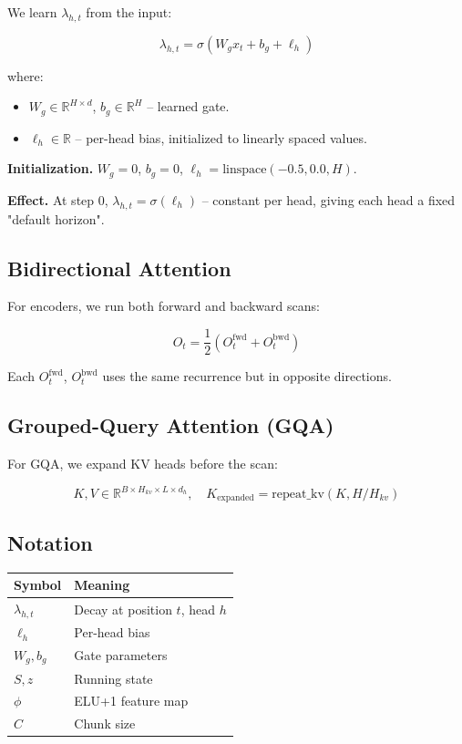 We learn $\lambda_{h,t}$ from the input:

\begin{equation}
\lambda_{h,t} = \sigma(W_g x_t + b_g + \ell_h)
\end{equation}

where:

\begin{itemize}
\item $W_g \in \mathbb{R}^{H \times d}$, $b_g \in \mathbb{R}^H$ -- learned gate.
\item $\ell_h \in \mathbb{R}$ -- per-head bias, initialized to linearly spaced
  values.

\end{itemize}
\textbf{Initialization.} $W_g = 0$, $b_g = 0$, $\ell_h = \text{linspace}(-0.5, 0.0, H)$.

\textbf{Effect.} At step 0, $\lambda_{h,t} = \sigma(\ell_h)$ -- constant per head, 
giving each head a fixed "default horizon".

\subsection{Bidirectional Attention}

For encoders, we run both forward and backward scans:

\begin{equation}
O_t = \frac{1}{2} \left( O_t^\text{fwd} + O_t^\text{bwd} \right)
\end{equation}

Each $O_t^\text{fwd}$, $O_t^\text{bwd}$ uses the same recurrence but in 
opposite directions.

\subsection{Grouped-Query Attention (GQA)}

For GQA, we expand KV heads before the scan:

\begin{equation}
K, V \in \mathbb{R}^{B \times H_{kv} \times L \times d_h}, \quad
K_\text{expanded} = \text{repeat\_kv}(K, H / H_{kv})
\end{equation}

\subsection{Notation}

\begin{table}[H]
\centering
\small
\begin{tabular}{ll}
\toprule
\textbf{Symbol} & \textbf{Meaning} \\
\midrule
$\lambda_{h,t}$ & Decay at position $t$, head $h$ \\
$\ell_h$ & Per-head bias \\
$W_g, b_g$ & Gate parameters \\
$S, z$ & Running state \\
$\phi$ & ELU+1 feature map \\
$C$ & Chunk size \\
\bottomrule
\end{tabular}
\end{table}

